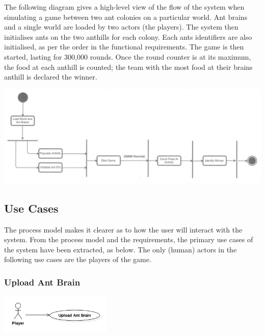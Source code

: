 \documentclass[11pt]{article}
\begin{document}
The following diagram gives a high-level view of the flow of the system
when simulating a game between two ant colonies on a particular world.
Ant brains and a single world are loaded by two actors (the players).
The system then initialises ants on the two anthills for each colony.
Each ants identifiers are also initialised, as per the order in the
functional requirements. The game is then started, lasting for 300,000
rounds. Once the round counter is at its maximum, the food at each
anthill is counted; the team with the most food at their brains anthill
is declared the winner.

\begin{center}
\includegraphics[width=\textwidth]{diagrams/process-model-game.png}
\end{center}

\subsection{Use Cases}\label{use-cases}

The process model makes it clearer as to how the user will interact with
the system. From the process model and the requirements, the primary use
cases of the system have been extracted, as below. The only (human)
actors in the following use cases are the players of the game.

\subsubsection{Upload Ant Brain}\label{upload-ant-brain}

\begin{center}
\includegraphics[width=0.4\textwidth]{diagrams/use-case-1-upload-ant-brain.png}
\end{center}
\end{document}

